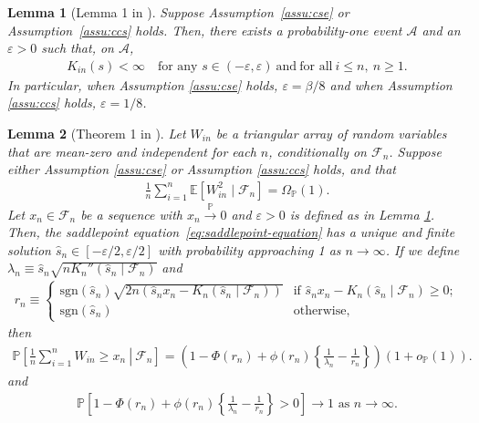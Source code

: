 \documentclass[12pt]{article}
\newtheorem{lemma}{Lemma}
\theoremstyle{definition}
\def\P{\mathbb{P}}
\def\sgn{\mathrm{sgn}}
\def\P{\mathbb{P}}
\newcommand{\E}{\mathbb E}								%
\renewcommand{\P}{\mathbb{P}}							%
\begin{document}
\begin{lemma}[Lemma 1 in \cite{Niu2024}]\label{lem:finite_cgf}
  Suppose Assumption~\ref{assu:cse} or Assumption~\ref{assu:ccs} holds. Then, there exists a probability-one event $\mathcal A$ and an $\varepsilon > 0$ such that, on $\mathcal A$,
  \begin{align}
  K_{in}(s) < \infty\quad \text{for any } s\in (-\varepsilon,\varepsilon)\ \text{and}\ \text{for all}\ i \leq n,\ n \geq 1 \label{eq:finite_cgf}.
  \end{align}
  In particular, when Assumption \ref{assu:cse} holds, $\varepsilon=\beta/8$ and when Assumption \ref{assu:ccs} holds, $\varepsilon=1/8$.
  \end{lemma}



\begin{lemma}[Theorem 1 in \cite{Niu2024}]\label{cor:spa_conditional_inid}
	Let $W_{in}$ be a triangular array of random variables that are mean-zero and independent for each $n$, conditionally on $\mathcal F_n$. Suppose either Assumption \ref{assu:cse} or Assumption \ref{assu:ccs} holds, and that
	\begin{align}\label{eq:lower_bound_conditional_variance}
		\frac{1}{n}\sum_{i=1}^n \E[W_{in}^2 \mid \mathcal{F}_n]=\Omega_{\P}(1).
	\end{align}
	Let $x_n \in \mathcal F_n$ be a sequence with $x_n \overset{\P} \rightarrow 0$ and $\varepsilon>0$ is defined as in Lemma \ref{lem:finite_cgf}. Then, the saddlepoint equation~\eqref{eq:saddlepoint-equation} has a unique and finite solution $\hat s_n \in [-\varepsilon/2, \varepsilon/2]$ with probability approaching 1 as $n \rightarrow \infty$. If we define $\lambda_n \equiv \hat s_n\sqrt{nK_n''(\hat s_n\mid\mathcal{F}_n)}$ and
	  \begin{align*}
		r_n \equiv
		\begin{cases}
		  \sgn(\hat s_n) \sqrt{2n( \hat s_n x_n - K_n(\hat s_n\mid\mathcal{F}_n))} & \text{if } \hat s_n x_n - K_n(\hat s_n\mid\mathcal{F}_n)\geq 0;\\
		  \mathrm{sgn}(\hat s_n) & \text{otherwise},
		\end{cases}
		\end{align*}
	  then
	  \begin{align*}
		\P\left[\left.\frac{1}{n}\sum_{i = 1}^n W_{in} \geq x_n\ \right|\ \mathcal{F}_n\right]=\left(1-\Phi(r_n)+\phi(r_n)\left\{\frac{1}{\lambda_n}-\frac{1}{r_n}\right\}\right)(1+o_{\P}(1)).
	  \end{align*}
    and 
    \begin{align*}
      \P\left[1-\Phi(r_n)+\phi(r_n)\left\{\frac{1}{\lambda_n}-\frac{1}{r_n}\right\}>0\right]\rightarrow1 \text{ as }n\rightarrow\infty.
    \end{align*}
  \end{lemma}
\end{document}
